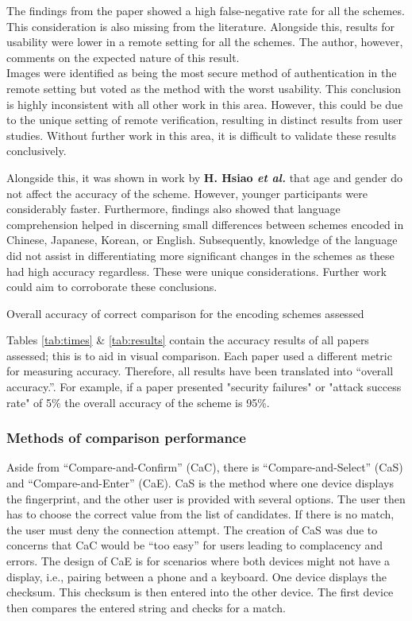 The findings from the paper showed a high false-negative rate for all the schemes. This consideration is also missing from the literature. Alongside this, results for usability were lower in a remote setting for all the schemes. The author, however, comments on the expected nature of this result.\\
Images were identified as being the most secure method of authentication in the remote setting but voted as the method with the worst usability. This conclusion is highly inconsistent with all other work in this area. However, this could be due to the unique setting of remote verification, resulting in distinct results from user studies. Without further work in this area, it is difficult to validate these results conclusively.

Alongside this, it was shown in work by \textbf{H. Hsiao \textit{et al.}}\cite{hsiao2009study} that age and gender do not affect the accuracy of the scheme. However, younger participants were considerably faster. Furthermore, findings also showed that language comprehension helped in discerning small differences between schemes encoded in Chinese, Japanese, Korean, or English. Subsequently, knowledge of the language did not assist in differentiating more significant changes in the schemes as these had high accuracy regardless. These were unique considerations. Further work could aim to corroborate these conclusions.

\begin{table}[h!]
    \makebox[\textwidth][c]{
        
    }%
    \caption{Overall accuracy of correct comparison for the encoding schemes assessed}
    \label{tab:results}
\end{table}

Tables \ref{tab:times} \& \ref{tab:results} contain the accuracy results of all papers assessed; this is to aid in visual comparison. Each paper used a different metric for measuring accuracy. Therefore, all results have been translated into ``overall accuracy.''. For example, if a paper presented "security failures" or "attack success rate" of 5\% the overall accuracy of the scheme is 95\%.

\subsubsection*{Methods of comparison performance}
Aside 
from ``Compare-and-Confirm'' (CaC), there is ``Compare-and-Select'' (CaS) and ``Compare-and-Enter'' (CaE). CaS is the method where one device displays the fingerprint, and the other user is provided with several options. The user then has to choose the correct value from the list of candidates. If there is no match, the user must deny the connection attempt. The creation of CaS was due to concerns that CaC would be ``too easy'' for users leading to complacency and errors\cite{uzun2007usability}. The design of CaE is for scenarios where both devices might not have a display, i.e., pairing between a phone and a keyboard. One device displays the checksum. This checksum is then entered into the other device. The first device then compares the entered string and checks for a match.

